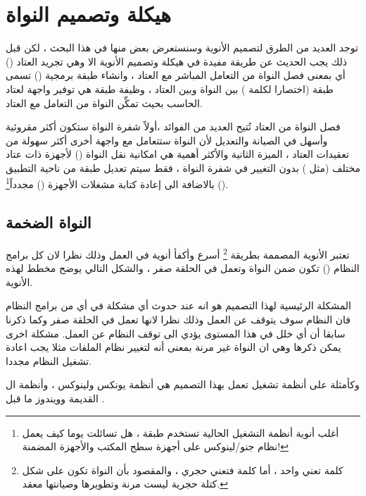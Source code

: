 \documentclass[document.tex]{subfiles}
\begin{document}
\section{هيكلة وتصميم النواة}
توجد العديد من الطرق لتصميم الأنوية وسنستعرض بعض منها في هذا البحث ، لكن قبل ذلك يجب الحديث عن طريقة مفيدة في هيكلة وتصميم الأنوية الا وهي تجريد العتاد () أي بمعنى فصل النواة من التعامل المباشر مع العتاد ، وانشاء طبقة برمجية () تسمى طبقة  (اختصارا لكلمة ) بين النواة وبين العتاد ، وظيفة طبقة  هي توفير واجهة لعتاد الحاسب بحيث تمكِّن النواة من التعامل مع العتاد.


فصل النواة من العتاد تُتيح العديد من الفوائد ،أولاً شفرة النواة ستكون أكثر مقروئية وأسهل في الصيانة والتعديل لأن النواة ستتعامل مع واجهة أخرى أكثر سهولة من تعقيدات العتاد ، الميزة الثانية والأكثر أهمية هي امكانية نقل النواة () لأجهزة ذات عتاد مختلف (مثل ) بدون التغيير في شفرة النواة ، فقط سيتم تعديل طبقة  من ناحية التطبيق () بالاضافة الى إعادة كتابة مشغلات الأجهزة () مجدداً\footnote{أغلب أنوية أنظمة التشغيل الحالية تستخدم طبقة ، هل تسائلت يوما كيف يعمل نظام جنو/لينوكس على أجهزة سطح المكتب والأجهزة المضمنة!}.

\subsection{النواة الضخمة }
تعتبر الأنوية المصممة بطريقة \footnote{كلمة  تعني واحد ، أما كلمة  فتعني حجري ، والمقصود بأن النواة تكون على شكل كتلة حجرية ليست مرنة وتطويرها وصيانتها معقد.} أسرع وأكفأ أنوية في العمل وذلك نظرا لان كل برامج النظام () تكون ضمن النواة وتعمل في الحلقة صفر ، والشكل التالي يوضح مخطط لهذه الأنوية.


المشكلة الرئيسية لهذا التصميم هو انه عند حدوث أي مشكلة في أي من برامج النظام فان النظام سوف يتوقف عن العمل وذلك نظرا لانها تعمل في الحلقة صفر وكما ذكرنا سابقا أن أي خلل في هذا المستوى يؤدي الى توقف النظام عن العمل. مشكلة اخرى يمكن ذكرها وهي ان النواة غير مرنة بمعنى أنه لتغيير نظام الملفات مثلا يجب اعادة تشغيل النظام مجددا.

وكأمثلة على أنظمة تشغيل تعمل بهذا التصميم هي أنظمة يونكس ولينوكس ، وأنظمة ال  القديمة وويندوز  ما قبل .
\end{document}
